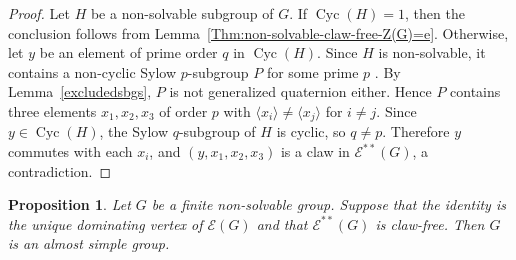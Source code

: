\documentclass[preprint,11pt]{elsarticle}
\newcommand{\cyc}{\operatorname{Cyc}}
\newtheorem{proposition}[theorem]{\bf Proposition}
\begin{document}
 \begin{proof}
 Let $H$ be a non-solvable subgroup of $G$. If $\cyc(H)=1$, then the conclusion follows from Lemma~\ref{Thm:non-solvable-claw-free-Z(G)=e}. Otherwise, let $y$ be an element of prime order $q$ in $\cyc(H)$. Since $H$ is non-solvable, it contains a non-cyclic Sylow $p$-subgroup $P$ for some prime $p$ \cite[IV 2.11 Satz]{Endliche-gruppen-I-Huppert}. By Lemma~\ref{excludedsbgs}, $P$ is not generalized quaternion either. Hence $P$ contains three elements $x_1, x_2, x_3$ of order $p$ with $\langle x_i \rangle \neq \langle x_j \rangle$ for $i \neq j$. Since $y\in\cyc(H)$, the Sylow $q$-subgroup of $H$ is cyclic, so $q\neq p$. Therefore $y$ commutes with each $x_i$, and $(y, x_1, x_2, x_3)$ is a claw in $\mathcal{E}^{**}(G)$, a contradiction.
 \end{proof}
 
 






\begin{proposition}\label{prop:Fstar-F}
	Let $G$ be a finite non-solvable group. Suppose that the identity is the unique dominating vertex of $\mathcal{E}(G)$ and that  $\mathcal{E}^{**}(G)$ is claw-free. Then 
$G$ is an almost simple group.
\end{proposition}
\end{document}
